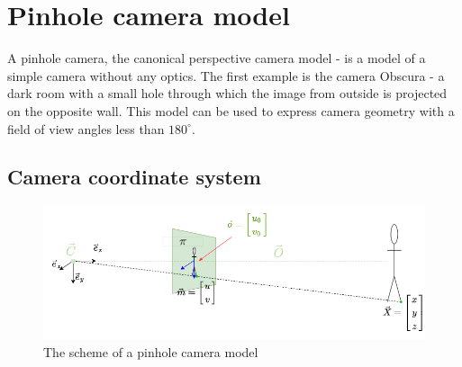 


\section{Pinhole camera model}
A pinhole camera, the canonical perspective camera model - is a model of a simple camera without any optics.
The first example is the camera Obscura - a dark room with a small hole through which the image from outside is projected on the opposite wall. 
This model can be used to express camera geometry with a field of view angles less than $180^{\circ}$.

\subsection{Camera coordinate system}
\begin{figure}[h]
    \centering
    \includegraphics[width=\textwidth]{graphics/td_scene.png}
    \caption{The scheme of a pinhole camera model}
    \label{fig:td_scene_3d}
\end{figure}

